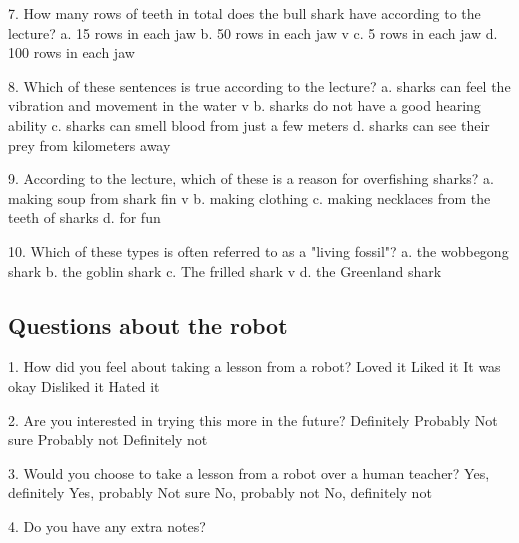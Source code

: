 7. How many rows of teeth in total does the bull shark have according to the lecture?
a. 15 rows in each jaw
b. 50 rows in each jaw v
c. 5 rows in each jaw
d. 100 rows in each jaw

8. Which of these sentences is true according to the lecture?
a. sharks can feel the vibration and movement in the water v
b. sharks do not have a good hearing ability
c. sharks can smell blood from just a few meters
d. sharks can see their prey from kilometers away

9. According to the lecture, which of these is a reason for overfishing sharks?
a. making soup from shark fin v
b. making clothing
c. making necklaces from the teeth of sharks
d. for fun

10. Which of these types is often referred to as a "living fossil"?
a. the wobbegong shark
b. the goblin shark
c. The frilled shark v 
d. the Greenland shark

\subsection{Questions about the robot}

1. How did you feel about taking a lesson from a robot?
Loved it
Liked it
It was okay
Disliked it
Hated it

2. Are you interested in trying this more in the future?
Definitely
Probably
Not sure
Probably not
Definitely not

3. Would you choose to take a lesson from a robot over a human teacher?
Yes, definitely
Yes, probably
Not sure
No, probably not
No, definitely not

4. Do you have any extra notes?